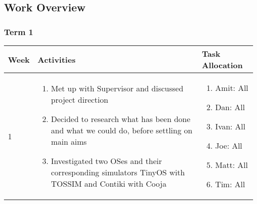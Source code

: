 \subsection{Work Overview}

\subsubsection{Term 1}

\begin{center}
	\begin{longtable}{| l | p{9cm} | p{3.5cm} |}
	\hline
	Week & Activities & Task Allocation\\
	\hline
	1 & \begin{enumerate}
			\item Met up with Supervisor and discussed project direction
			\item Decided to research what has been done and what we could do, before settling on main aims
			\item Investigated two OSes and their corresponding simulators TinyOS with TOSSIM and Contiki with Cooja
		\end{enumerate} &
	\begin{enumerate}
		\item[] Amit: All
		\item[] Dan: All
		\item[] Ivan: All
		\item[] Joe: All
		\item[] Matt: All
		\item[] Tim: All
	\end{enumerate}
	\\ \hline


\end{longtable}
\end{center}
